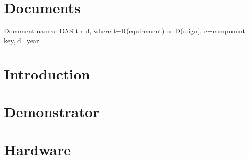 \documentclass{democlass}
\begin{document}
 \cleardoublepage
\thispagestyle{empty} \tableofcontents \thispagestyle{empty} \cleardoublepage
{}

 \cleardoublepage
 \cleardoublepage
 \cleardoublepage

\setcounter{chapter}{0}
\chapter{Documents}
Document names: DAS-t-c-d, where t=R(equirement) or D(esign), c=component key, d=year.\\







\cleardoublepage
\chapter{Introduction}
 \cleardoublepage
\chapter{Demonstrator}
 \cleardoublepage
\chapter{Hardware}
 \cleardoublepage
\end{document}
